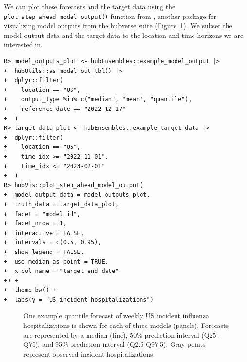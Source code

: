 \documentclass[
  article,
  shortnames,
  notitle]{jss}
\begin{document}
We can plot these forecasts and the target data using the
\texttt{plot\_step\_ahead\_model\_output()} function from ,
another package for visualizing model outputs from the hubverse suite
(Figure~\ref{fig-plot-ex-mods}). We subset the model output data and the
target data to the location and time horizons we are interested in.

\begin{verbatim}
R> model_outputs_plot <- hubEnsembles::example_model_output |>
+  hubUtils::as_model_out_tbl() |>
+  dplyr::filter(
+    location == "US",
+    output_type %in% c("median", "mean", "quantile"),
+    reference_date == "2022-12-17"
+  )
R> target_data_plot <- hubEnsembles::example_target_data |>
+  dplyr::filter(
+    location == "US",
+    time_idx >= "2022-11-01",
+    time_idx <= "2023-02-01"
+  )
R> hubVis::plot_step_ahead_model_output(
+  model_output_data = model_outputs_plot,
+  truth_data = target_data_plot,
+  facet = "model_id",
+  facet_nrow = 1,
+  interactive = FALSE,
+  intervals = c(0.5, 0.95),
+  show_legend = FALSE,
+  use_median_as_point = TRUE,
+  x_col_name = "target_end_date"
+) +
+  theme_bw() +
+  labs(y = "US incident hospitalizations")
\end{verbatim}

\begin{figure}[H]


\caption{\label{fig-plot-ex-mods}One example quantile forecast of weekly
US incident influenza hospitalizations is shown for each of three models
(panels). Forecasts are represented by a median (line), 50\% prediction
interval (Q25-Q75), and 95\% prediction interval (Q2.5-Q97.5). Gray
points represent observed incident hospitalizations.}

\end{figure}%
\end{document}
